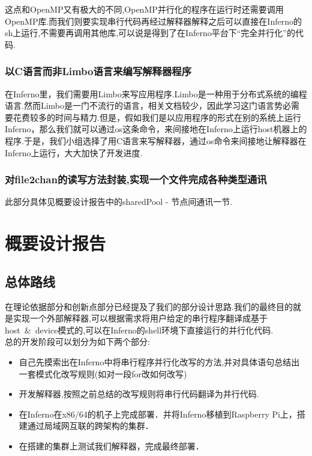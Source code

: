 \documentclass[paper=a4]{ctexart} %
\numberwithin{equation}{section} %
\numberwithin{figure}{section} %
\numberwithin{table}{section} %
\newcommand{\n}{\\\indent}
\begin{document}
这点和OpenMP又有极大的不同,OpenMP并行化的程序在运行时还需要调用OpenMP库.而我们则要实现串行代码再经过解释器解释之后可以直接在Inferno的sh上运行,不需要再调用其他库,可以说是得到了在Inferno平台下“完全并行化”的代码.

\subsubsection{以C语言而非Limbo语言来编写解释器程序}
在Inferno里，我们需要用Limbo来写应用程序.Limbo是一种用于分布式系统的编程语言.然而Limbo是一门不流行的语言，相关文档较少，因此学习这门语言势必需要花费较多的时间与精力.但是，假如我们是以应用程序的形式在别的系统上运行Inferno，那么我们就可以通过os这条命令，来间接地在Inferno上运行host机器上的程序.于是，我们小组选择了用C语言来写解释器，通过os命令来间接地让解释器在Inferno上运行，大大加快了开发进度.

\subsubsection{对file2chan的读写方法封装,实现一个文件完成各种类型通讯}
此部分具体见概要设计报告中的sharedPool - 节点间通讯一节. 


\section{概要设计报告}

\subsection{总体路线}
在理论依据部分和创新点部分已经提及了我们的部分设计思路.我们的最终目的就是实现一个外部解释器,可以根据需求将用户给定的串行程序翻译成基于host~\&~device模式的,可以在Inferno的shell环境下直接运行的并行化代码. \n
总的开发阶段可以划分为如下两个部分:
\begin{itemize}
\item 自己先摸索出在Inferno中将串行程序并行化改写的方法,并对具体语句总结出一套模式化改写规则(如对一段for改如何改写)
\item 开发解释器,按照之前总结的改写规则将串行代码翻译为并行代码.
\item 在Inferno在x86/64的机子上完成部署．并将Inferno移植到Raspberry Pi上，搭建通过局域网互联的跨架构的集群．
\item 在搭建的集群上测试我们解释器，完成最终部署．
\end{itemize}
~\n
\end{document}
